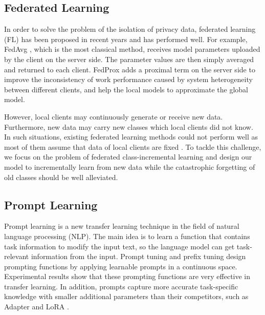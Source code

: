 \documentclass[sigconf,anonymous,review,screen]{acmart}
\begin{document}
\subsection{Federated Learning}
In order to solve the problem of the isolation of privacy data, federated learning (FL) \cite{mcmahan2017communication,li2020federated,tan2022fedproto,ma2022layer} has been proposed in recent years and has performed well. %
For example, FedAvg \cite{mcmahan2017communication}, which is the most classical method, receives model parameters uploaded by the client on the server side. The parameter values are then simply averaged and returned to each client. FedProx \cite{li2020federated} adds a proximal term on the server side to improve the inconsistency of work performance caused by system heterogeneity between different clients, and help the local models to approximate the global model. %

However, local clients may continuously generate or receive new data. Furthermore, new data may carry new classes which local clients did not know. In such situations, existing federated learning methods could not perform well as most of them assume that data of local clients are fixed \cite{dong2022federated}. To tackle this challenge, we focus on the problem of federated class-incremental learning and design our model to incrementally learn from new data while the catastrophic forgetting of old classes should be well alleviated.


\subsection{Prompt Learning}
Prompt learning is a new transfer learning technique in the field of natural language processing (NLP). The main idea is to learn a function that contains task information to modify the input text, so the language model can get task-relevant information from the input. Prompt tuning \cite{lester2021power} and prefix tuning \cite{li2021prefix} design prompting functions by applying learnable prompts in a continuous space. Experimental results show that these prompting functions are very effective in transfer learning. In addition, prompts capture more accurate task-specific knowledge with smaller additional parameters than their competitors, such as Adapter \cite{pfeiffer2021adapterfusion,wang2021k} and LoRA \cite{hu2022lora}. 
\end{document}

